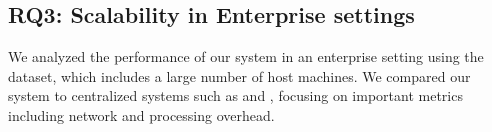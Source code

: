 


\subsection{RQ3: Scalability in Enterprise settings}
\label{cost_metric}
We analyzed the performance of our system in an enterprise setting using the \optc dataset, which includes a large number of host machines. We compared our system to centralized systems such as \flash and \kairos, focusing on important metrics including network and processing overhead. 

